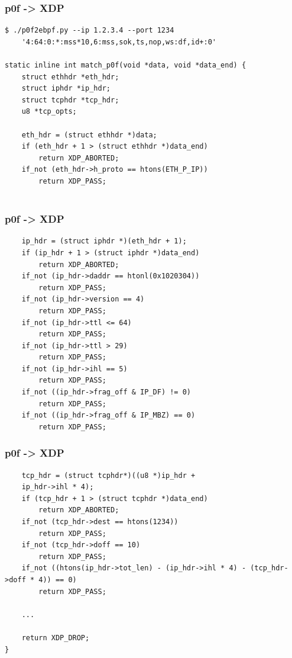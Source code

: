 \documentclass{beamer}
\begin{document}
\begin{frame}[fragile]
\frametitle{p0f -> XDP}
\begin{verbatim}
$ ./p0f2ebpf.py --ip 1.2.3.4 --port 1234 
    '4:64:0:*:mss*10,6:mss,sok,ts,nop,ws:df,id+:0'

static inline int match_p0f(void *data, void *data_end) {
    struct ethhdr *eth_hdr;
    struct iphdr *ip_hdr;
    struct tcphdr *tcp_hdr;
    u8 *tcp_opts;

    eth_hdr = (struct ethhdr *)data;
    if (eth_hdr + 1 > (struct ethhdr *)data_end)
        return XDP_ABORTED;
    if_not (eth_hdr->h_proto == htons(ETH_P_IP))
        return XDP_PASS;


\end{verbatim}
\end{frame}

\begin{frame}[fragile]
\frametitle{p0f -> XDP}
\begin{verbatim}
    ip_hdr = (struct iphdr *)(eth_hdr + 1);
    if (ip_hdr + 1 > (struct iphdr *)data_end)
        return XDP_ABORTED;
    if_not (ip_hdr->daddr == htonl(0x1020304))
        return XDP_PASS;
    if_not (ip_hdr->version == 4)
        return XDP_PASS;
    if_not (ip_hdr->ttl <= 64)
        return XDP_PASS;
    if_not (ip_hdr->ttl > 29)
        return XDP_PASS;
    if_not (ip_hdr->ihl == 5)
        return XDP_PASS;
    if_not ((ip_hdr->frag_off & IP_DF) != 0)
        return XDP_PASS;
    if_not ((ip_hdr->frag_off & IP_MBZ) == 0)
        return XDP_PASS;
\end{verbatim}
\end{frame}

\begin{frame}[fragile]
  \frametitle{p0f -> XDP}
  \begin{verbatim}
    tcp_hdr = (struct tcphdr*)((u8 *)ip_hdr +
    ip_hdr->ihl * 4);
    if (tcp_hdr + 1 > (struct tcphdr *)data_end)
        return XDP_ABORTED;
    if_not (tcp_hdr->dest == htons(1234))
        return XDP_PASS;
    if_not (tcp_hdr->doff == 10)
        return XDP_PASS;
    if_not ((htons(ip_hdr->tot_len) - (ip_hdr->ihl * 4) - (tcp_hdr->doff * 4)) == 0)
        return XDP_PASS;

    ...

    return XDP_DROP;
}
  \end{verbatim}
\end{frame}
\end{document}
